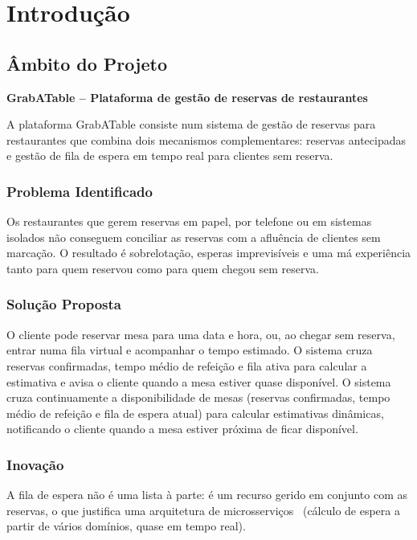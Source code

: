 \chapter{Introdução}

\section{Âmbito do Projeto}

\textbf{GrabATable – Plataforma de gestão de reservas de restaurantes}

A plataforma GrabATable consiste num sistema de gestão de reservas para restaurantes que combina dois mecanismos complementares: reservas antecipadas e gestão de fila de espera em tempo real para clientes sem reserva.

\subsection{Problema Identificado}

Os restaurantes que gerem reservas em papel, por telefone ou em sistemas isolados não conseguem conciliar as reservas com a afluência de clientes sem marcação. O resultado é sobrelotação, esperas imprevisíveis e uma má experiência tanto para quem reservou como para quem chegou sem reserva.

\subsection{Solução Proposta}

O cliente pode reservar mesa para uma data e hora, ou, ao chegar sem reserva, entrar numa fila virtual e acompanhar o tempo estimado. O sistema cruza reservas confirmadas, tempo médio de refeição e fila ativa para calcular a estimativa e avisa o
cliente quando a mesa estiver quase disponível. O sistema cruza continuamente a disponibilidade de mesas (reservas confirmadas, tempo médio de refeição e fila de espera atual) para calcular estimativas dinâmicas, notificando o cliente quando a mesa estiver próxima de ficar disponível.

\subsection{Inovação}

A fila de espera não é uma lista à parte: é um recurso gerido em conjunto com as
reservas, o que justifica uma arquitetura de microsserviços~\cite{newman,lewisfowler} (cálculo de espera a partir de
vários domínios, quase em tempo real).

